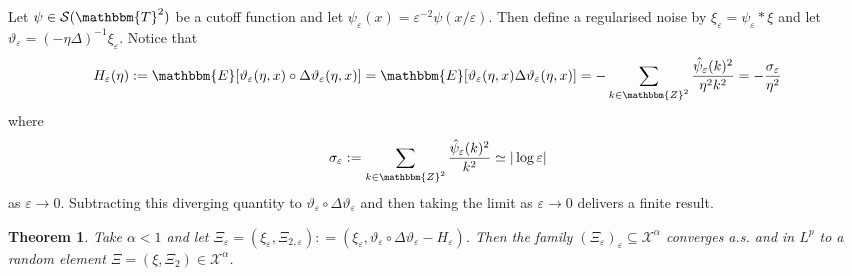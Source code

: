 \documentclass[11pt,reqno]{amsart}
\newcommand{\assign}{:=}
\newtheorem{theorem}{Theorem}
\begin{document}
Let $\psi \in \mathcal{S} (\mathbbm{T}^2)$ be a cutoff function and let
$\psi_{\varepsilon} (x) = \varepsilon^{- 2} \psi (x / \varepsilon)$. Then
define a regularised noise by $\xi_{\varepsilon} = \psi_{\varepsilon} \ast
\xi$ and let $\vartheta_{\varepsilon} = (- \eta \Delta)^{- 1}
\xi_{\varepsilon}$. Notice that
\[ H_{\varepsilon} (\eta) \assign \mathbbm{E} [\vartheta_{\varepsilon} (\eta,
   x) \circ \Delta \vartheta_{\varepsilon} (\eta, x)] =\mathbbm{E}
   [\vartheta_{\varepsilon} (\eta, x) \Delta \vartheta_{\varepsilon} (\eta,
   x)] = - \sum_{k \in \mathbbm{Z}^2} \frac{\hat{\psi}_{\varepsilon}
   (k)^2}{\eta^2 k^2} = - \frac{\sigma_{\varepsilon}}{\eta^2} \]
where
\[ \sigma_{\varepsilon} \assign \sum_{k \in \mathbbm{Z}^2}
   \frac{\hat{\psi}_{\varepsilon} (k)^2}{k^2} \simeq | \log \varepsilon | \]
as $\varepsilon \rightarrow 0$. Subtracting this diverging quantity to
$\vartheta_{\varepsilon} \circ \Delta \vartheta_{\varepsilon}$ and then taking
the limit as $\varepsilon \rightarrow 0$ delivers a finite result.

\begin{theorem}
  \label{th:conv-white-noise}Take $\alpha < 1$ and let $\Xi_{\varepsilon} =
  (\xi_{\varepsilon}, \Xi_{2, \varepsilon}) : = (\xi_{\varepsilon},
  \vartheta_{\varepsilon} \circ \Delta \vartheta_{\varepsilon} -
  H_{\varepsilon})$. Then the family $(\Xi_{\varepsilon})_{\varepsilon}
  \subseteq \mathcal{X}^{\alpha}$ converges a.s. and in $L^p$ to a random
  element $\Xi = (\xi, \Xi_2) \in \mathcal{X}^{\alpha}$.
\end{theorem}
\end{document}
